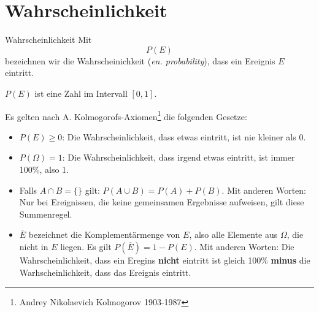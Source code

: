 
\section{Wahrscheinlichkeit}
\begin{definition}{Wahrscheinlichkeit}{}
Mit $$P(E)$$ bezeichnen wir die Wahrscheinichkeit (\textit{en. probability}), dass ein Ereignis $E$ eintritt.

$P(E)$ ist eine Zahl im Intervall $[0,1]$.
\end{definition}

Es gelten nach A. Kolmogorofs-Axiomen\footnote{Andrey Nikolaevich Kolmogorov 1903-1987} die folgenden Gesetze:

\begin{gesetz}{}{}
\begin{itemize}
\item $P(E) \ge 0$: Die Wahrscheinlichkeit, dass etwas eintritt, ist nie kleiner als 0.
\item $P(\Omega) = 1$: Die Wahrscheinlichkeit, dass irgend etwas eintritt, ist immer 100\%, also 1.
\item Falls $A \cap B = \{\}$ gilt: $P(A\cup B) = P(A) + P(B)$. Mit anderen Worten: Nur bei Ereignissen, die keine gemeinsamen Ergebnisse aufweisen, gilt diese Summenregel.
\item $\overline{E}$ bezeichnet die Komplementärmenge von $E$, also alle Elemente aus $\Omega$, die nicht in $E$ liegen. Es gilt $P(\overline{E}) = 1-P(E)$. Mit anderen Worten: Die Wahrscheinlichkeit, dass ein Eregins \textbf{nicht} eintritt ist gleich 100\% \textbf{minus} die Warhscheinlichkeit, dass das Ereignis eintritt.
\end{itemize}
\end{gesetz}

\newpage

